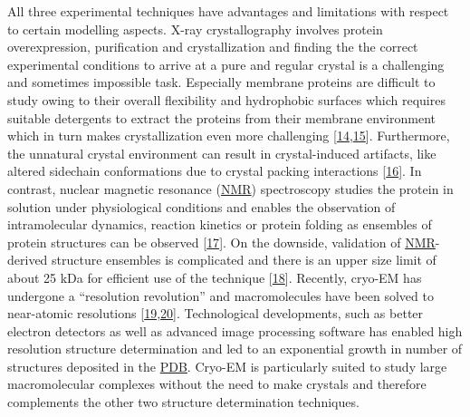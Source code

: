 \documentclass[11pt,a4paper,twoside]{book}
\theoremstyle{definition}
\theoremstyle{definition}
\theoremstyle{remark}
\begin{document}
All three experimental techniques have advantages and limitations with
respect to certain modelling aspects. X-ray crystallography involves
protein overexpression, purification and crystallization and finding the
the correct experimental conditions to arrive at a pure and regular
crystal is a challenging and sometimes impossible task. Especially
membrane proteins are difficult to study owing to their overall
flexibility and hydrophobic surfaces which requires suitable detergents
to extract the proteins from their membrane environment which in turn
makes crystallization even more challenging
{[}\protect\hyperlink{ref-Carpenter2008}{14},\protect\hyperlink{ref-Moraes2014}{15}{]}.
Furthermore, the unnatural crystal environment can result in
crystal-induced artifacts, like altered sidechain conformations due to
crystal packing interactions
{[}\protect\hyperlink{ref-Jacobson2002}{16}{]}. In contrast, nuclear
magnetic resonance (\protect\hyperlink{abbrev}{NMR}) spectroscopy
studies the protein in solution under physiological conditions and
enables the observation of intramolecular dynamics, reaction kinetics or
protein folding as ensembles of protein structures can be observed
{[}\protect\hyperlink{ref-Bieri2011}{17}{]}. On the downside, validation
of \protect\hyperlink{abbrev}{NMR}-derived structure ensembles is
complicated and there is an upper size limit of about 25 kDa for
efficient use of the technique
{[}\protect\hyperlink{ref-Billeter2008}{18}{]}. Recently, cryo-EM has
undergone a ``resolution revolution'' and macromolecules have been
solved to near-atomic resolutions
{[}\protect\hyperlink{ref-Egelman2016}{19},\protect\hyperlink{ref-Fernandez-Leiro2016}{20}{]}.
Technological developments, such as better electron detectors as well as
advanced image processing software has enabled high resolution structure
determination and led to an exponential growth in number of structures
deposited in the \protect\hyperlink{abbrev}{PDB}. Cryo-EM is
particularly suited to study large macromolecular complexes without the
need to make crystals and therefore complements the other two structure
determination techniques.
\end{document}
